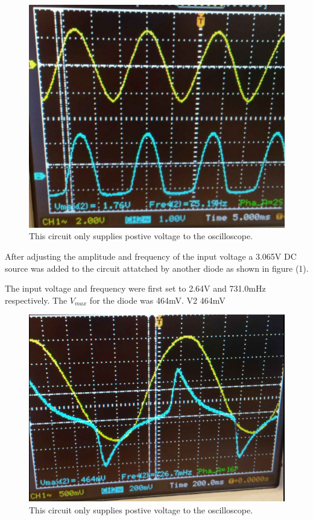 \documentclass[twocolumn, amsmath]{revtex4}
\begin{document}
\begin{figure}
    \includegraphics[scale=0.3]{1760mV.png}  
    \caption{This circuit only supplies postive voltage to the oscilloscope.}
\end{figure}


After adjusting the amplitude and frequency of the input voltage a 3.065V DC source was added to the circuit attatched by another diode as shown in figure (1). 

The input voltage and frequency were first set to 2.64V and 731.0mHz respectively. The $V_{max}$ for the diode was 464mV.
V2 464mV

\begin{figure}
    \includegraphics[scale=0.3]{464mV.png}  
    \caption{This circuit only supplies postive voltage to the oscilloscope.}
\end{figure}
\end{document}
